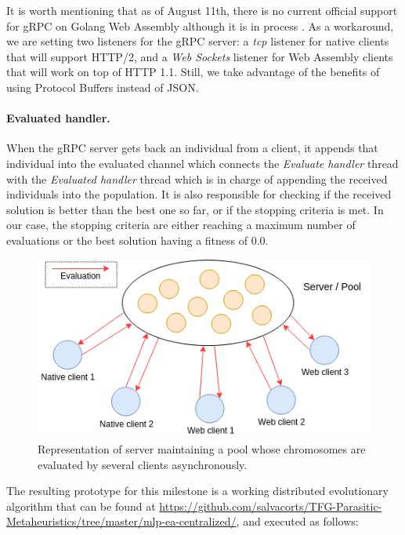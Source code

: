 It is worth mentioning that as of August 11th, there is no current official support for gRPC on Golang Web Assembly although it is in process \cite{grpc-wasm-issue}. As a workaround, we are setting two listeners for the gRPC server: a \textit{tcp} listener for native clients that will support HTTP/2, and a \textit{Web Sockets} listener for Web Assembly clients that will work on top of HTTP 1.1. Still, we take advantage of the benefits of using Protocol Buffers instead of JSON.

\paragraph*{Evaluated handler.} When the gRPC server gets back an individual from a client, it appends that individual into the evaluated channel which connects the \textit{Evaluate handler} thread with the \textit{Evaluated handler} thread which is in charge of appending the received individuals into the population. It is also responsible for checking if the received solution is better than the best one so far, or if the stopping criteria is met. In our case, the stopping criteria are either reaching a maximum number of evaluations or the best solution having a fitness of 0.0.

\begin{figure}[h!]
		\centering
    	\includegraphics[scale=0.5]{assets/images/tfg-net-milestone2.png}
    	\caption{Representation of server maintaining a pool whose chromosomes are evaluated by several clients asynchronously.}
    	\label{fig:tfg-net-milestone2}
\end{figure}

The resulting prototype for this milestone is a working distributed evolutionary algorithm that can be found at \href{github.com/salvacorts/TFG-Parasitic-Metaheuristics/tree/master/mlp-ea-centralized/common}{https://github.com/salvacorts/TFG-Parasitic-Metaheuristics/tree/master/mlp-ea-centralized/}, and executed as follows:

